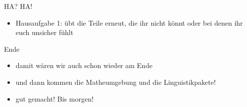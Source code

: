\begin{frame}[fragile]{HA? HA!}
    \begin{itemize}[<+->]
    \item Hausaufgabe 1: übt die Teile erneut, die ihr nicht könnt oder bei denen ihr euch unsicher fühlt
    \end{itemize}
\end{frame}

\begin{frame}[fragile]{Ende}
    \begin{itemize}[<+->]
    \item damit wären wir auch schon wieder am Ende
    \item und dann kommen die Matheumgebung und die Linguistikpakete!
    \item gut gemacht! Bis morgen!
    \end{itemize}
\end{frame}


